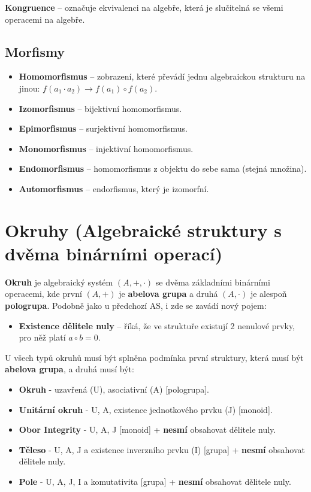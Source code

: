 \noindent \textbf{Kongruence} -- označuje ekvivalenci na algebře, která je slučitelná se všemi operacemi na algebře.

\subsection{Morfismy}
\begin{itemize}
    \item \textbf{Homomorfismus} -- zobrazení, které převádí jednu algebraickou strukturu na jinou: $f(a_1 \cdot a_2) \rightarrow f(a_1) \circ f(a_2)$.
    \item \textbf{Izomorfismus} -- bijektivní homomorfismus.
    \item \textbf{Epimorfismus} -- surjektivní homomorfismus.
    \item \textbf{Monomorfismus} -- injektivní homomorfismus.
    \item \textbf{Endomorfismus} -- homomorfismus z objektu do sebe sama (stejná množina).
    \item \textbf{Automorfismus} -- endorfismus, který je izomorfní.
\end{itemize}

\section{Okruhy (Algebraické struktury s dvěma binárními operací)}
\textbf{Okruh} je algebraický systém $(A, +, \cdot)$ se dvěma základními binárními operacemi, kde první $(A, +)$ je \textbf{abelova grupa} a druhá $(A, \cdot)$ je alespoň \textbf{pologrupa}. Podobně jako u předchozí AS, i zde se zavádí nový pojem:
\begin{itemize}
    \item \textbf{Existence dělitele nuly} -- říká, že ve struktuře existují 2 nenulové prvky, pro něž platí $a \circ b = 0$.
\end{itemize}
U všech typů okruhů musí být splněna podmínka první struktury, která musí být \textbf{abelova grupa}, a druhá musí být:
\begin{itemize}
    \item \textbf{Okruh} - uzavřená ({U}), asociativní ({A}) [pologrupa].
    \item \textbf{Unitární okruh} - {U}, {A}, existence jednotkového prvku (J) [monoid].
    \item \textbf{Obor Integrity} - {U}, {A}, {J} [monoid] + \textbf{nesmí} obsahovat dělitele nuly.
    \item \textbf{Těleso} - {U}, {A}, {J} a existence inverzního prvku (I) [grupa] + \textbf{nesmí} obsahovat dělitele nuly.
    \item \textbf{Pole} - {U}, {A}, {J}, {I} a komutativita [grupa] + \textbf{nesmí} obsahovat dělitele nuly.
\end{itemize}